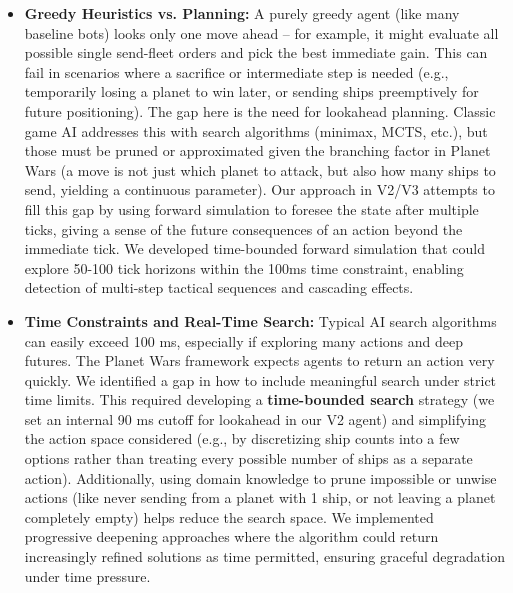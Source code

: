 \documentclass[conference]{IEEEtran}
\begin{document}
\begin{itemize}
\item \textbf{Greedy Heuristics vs. Planning:} A purely greedy agent (like many baseline bots) looks only one move ahead -- for example, it might evaluate all possible single send-fleet orders and pick the best immediate gain. This can fail in scenarios where a sacrifice or intermediate step is needed (e.g., temporarily losing a planet to win later, or sending ships preemptively for future positioning). The gap here is the need for lookahead planning. Classic game AI addresses this with search algorithms (minimax, MCTS, etc.), but those must be pruned or approximated given the branching factor in Planet Wars (a move is not just which planet to attack, but also how many ships to send, yielding a continuous parameter). Our approach in V2/V3 attempts to fill this gap by using forward simulation to foresee the state after multiple ticks, giving a sense of the future consequences of an action beyond the immediate tick. We developed time-bounded forward simulation that could explore 50-100 tick horizons within the 100ms time constraint, enabling detection of multi-step tactical sequences and cascading effects.

\item \textbf{Time Constraints and Real-Time Search:} Typical AI search algorithms can easily exceed 100 ms, especially if exploring many actions and deep futures. The Planet Wars framework expects agents to return an action very quickly. We identified a gap in how to include meaningful search under strict time limits. This required developing a \textbf{time-bounded search} strategy (we set an internal 90 ms cutoff for lookahead in our V2 agent) and simplifying the action space considered (e.g., by discretizing ship counts into a few options rather than treating every possible number of ships as a separate action). Additionally, using domain knowledge to prune impossible or unwise actions (like never sending from a planet with 1 ship, or not leaving a planet completely empty) helps reduce the search space. We implemented progressive deepening approaches where the algorithm could return increasingly refined solutions as time permitted, ensuring graceful degradation under time pressure.


\end{itemize}
\end{document}
